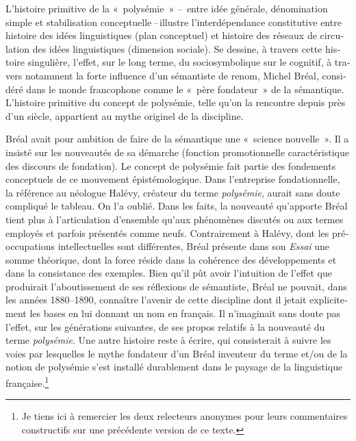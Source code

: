 \documentclass[french,output=paper,colorlinks,citecolor=brown]{../langscibook}
\begin{document}
\begin{otherlanguage}{french}
L’histoire primitive de la «~polysémie~» –~entre idée générale, dénomination simple et stabilisation conceptuelle\,–\,illustre l’interdépendance constitutive entre histoire des idées linguistiques (plan conceptuel) et histoire des réseaux de circulation des idées linguistiques (dimension sociale). Se dessine, à travers cette histoire singulière, l’effet, sur le long terme, du sociosymbolique sur le cognitif, à travers notamment la forte influence d’un sémantiste de renom, Michel Bréal, considéré dans le monde francophone comme le «~père fondateur~» de la sémantique. L’histoire primitive du concept de polysémie, telle qu’on la rencontre depuis près d’un siècle, appartient au mythe originel de la discipline.

Bréal avait pour ambition de faire de la sémantique une «~science nouvelle~». Il a insisté sur les nouveautés de sa démarche (fonction promotionnelle caractéristique des discours de fondation). Le concept de polysémie fait partie des fondements conceptuels de ce mouvement épistémologique. Dans l’entreprise fondationnelle, la référence au néologue Halévy, créateur du terme \textit{polysémie}, aurait sans doute compliqué le tableau. On l’a oublié. Dans les faits, la nouveauté qu’apporte Bréal tient plus à l’articulation d’ensemble qu’aux phénomènes discutés ou aux termes employés et parfois présentés comme neufs. Contrairement à Halévy, dont les préoccupations intellectuelles sont différentes, Bréal présente dans son \textit{Essai} une somme théorique, dont la force réside dans la cohérence des développements et dans la consistance des exemples. Bien qu’il pût avoir l’intuition de l’effet que produirait l’aboutissement de ses réflexions de sémantiste, Bréal ne pouvait, dans les années 1880--1890, connaître l’avenir de cette discipline dont il jetait explicitement les bases en lui donnant un nom en français. Il n’imaginait sans doute pas l’effet, sur les générations suivantes, de ses propos relatifs à la nouveauté du terme \textit{polysémie}. Une autre histoire reste à écrire, qui consisterait à suivre les voies par lesquelles le mythe fondateur d’un Bréal inventeur du terme et/ou de la notion de polysémie s’est installé durablement dans le paysage de la linguistique française.\footnote{Je tiens ici à remercier les deux relecteurs anonymes pour leurs commentaires constructifs sur une précédente version de ce texte.}

{\sloppy\printbibliography[heading=subbibliography,notkeyword=this]}
\end{otherlanguage}
\end{document}
